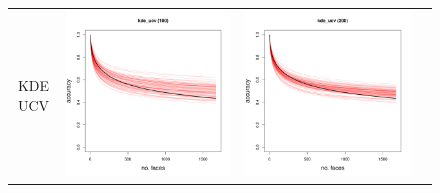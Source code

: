 \documentclass[twoside,11pt]{article}
\begin{document}
\begin{figure}
\begin{tabular}{cccc}
KDE UCV & 
\includegraphics[scale = 0.2, clip = true, trim = 0 0 0 0.6in]{repeat_100_kde_ucv.pdf} &
\includegraphics[scale = 0.2, clip = true, trim = 0 0 0 0.6in]{repeat_200_kde_ucv.pdf} &

\end{tabular}
\end{figure}
\end{document}
